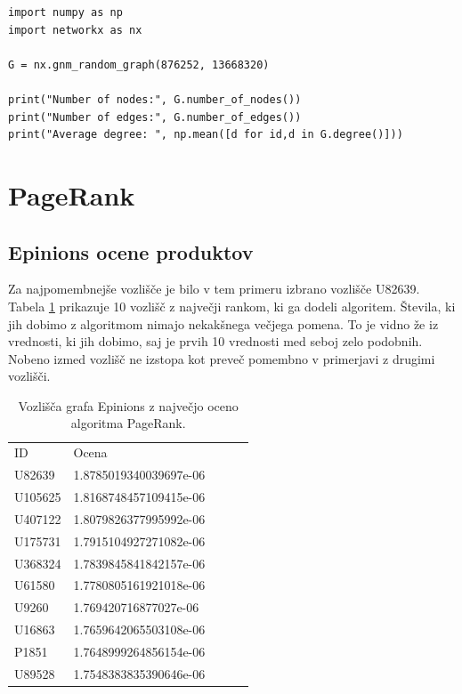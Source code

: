 \documentclass[a4paper,11pt]{article}
\begin{document}
\begin{lstlisting}
import numpy as np
import networkx as nx

G = nx.gnm_random_graph(876252, 13668320)

print("Number of nodes:", G.number_of_nodes())
print("Number of edges:", G.number_of_edges())
print("Average degree: ", np.mean([d for id,d in G.degree()]))
\end{lstlisting}


\section{PageRank}



\subsection{Epinions ocene produktov}

Za najpomembnejše vozlišče je bilo v tem primeru izbrano vozlišče U82639. Tabela \ref{my-label2} prikazuje 10 vozlišč z največji rankom, ki ga dodeli algoritem. Števila, ki jih dobimo z algoritmom nimajo nekakšnega večjega pomena. To je vidno že iz vrednosti, ki jih dobimo, saj je prvih 10 vrednosti med seboj zelo podobnih. Nobeno izmed vozlišč ne izstopa kot preveč pomembno v primerjavi z drugimi vozlišči.

\begin{table}[]
\centering
\caption{Vozlišča grafa Epinions z največjo oceno algoritma PageRank.}
\label{my-label2}
\begin{tabular}{|l|l|lll}
\cline{1-2}
ID &  Ocena &  &  &  \\ \cline{1-2}
 
 
 U82639& 1.8785019340039697e-06&  &  &  \\ \cline{1-2}
 U105625& 1.8168748457109415e-06&  &  &  \\ \cline{1-2}
 U407122& 1.8079826377995992e-06&  &  &  \\ \cline{1-2}
 U175731& 1.7915104927271082e-06&  &  &  \\ \cline{1-2}
 U368324& 1.7839845841842157e-06&  &  &  \\ \cline{1-2}
 U61580& 1.7780805161921018e-06&  &  &  \\ \cline{1-2}
 U9260& 1.769420716877027e-06&  &  &  \\ \cline{1-2}
 U16863& 1.7659642065503108e-06&  &  &  \\ \cline{1-2}
 P1851& 1.7648999264856154e-06&  &  &  \\ \cline{1-2}
 U89528& 1.7548383835390646e-06&  &  &  \\ \cline{1-2}
\end{tabular}
\end{table}
\end{document}
